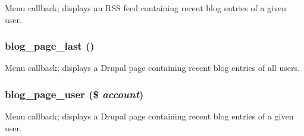 Menu callback; displays an RSS feed containing recent blog entries of a given user. \hypertarget{blog_8pages_8inc_6720685209529757688eed74112994e4}{
\subsubsection[{blog\_\-page\_\-last}]{\setlength{\rightskip}{0pt plus 5cm}blog\_\-page\_\-last ()}}
\label{blog_8pages_8inc_6720685209529757688eed74112994e4}


Menu callback; displays a Drupal page containing recent blog entries of all users. \hypertarget{blog_8pages_8inc_87fd5ef697f7fc4cccaf2c54933cc29a}{
\subsubsection[{blog\_\-page\_\-user}]{\setlength{\rightskip}{0pt plus 5cm}blog\_\-page\_\-user (\$ {\em account})}}
\label{blog_8pages_8inc_87fd5ef697f7fc4cccaf2c54933cc29a}


Menu callback; displays a Drupal page containing recent blog entries of a given user. 